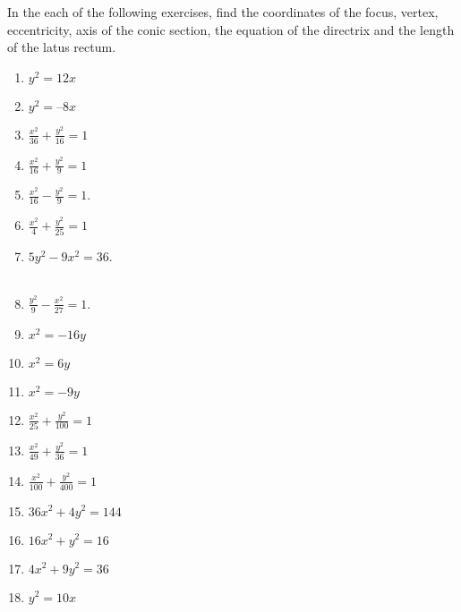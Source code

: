 In the each of the following exercises, find the coordinates of the focus, vertex, eccentricity, axis of the conic section, the equation of the directrix and the length of the latus rectum.
\begin{enumerate}[label=\thesubsection.\arabic*,ref=\thesubsection.\theenumi]
\item $y^2=12x$ 
\label{chapters/11/11/2/1}
\\
\solution

\item 
$y^2 = –8x$
  \item $\frac{x^2}{36}+\frac{y^2}{16}=1$
\\
\solution

  \item $\frac{x^2}{16}+\frac{y^2}{9}=1$
	\item $\frac{x^2}{16}-\frac{y^2}{9} = 1$. \\ 
		\solution
		
\begin{table}[H]
\centering
\caption{}
\label{tab:std-conic-params-sol}
\resizebox{\columnwidth}{!}{%
		
		}
\end{table}
  \item $\frac{x^2}{4}+\frac{y^2}{25}=1$
\\
\solution

	\item $5{y^2}-9{x^2}=36$.
		\\
		\solution
		\\
		
	\item $\frac{y^2}{9}-\frac{x^2}{27}=1$.
\item $x^2=-16y$
\\
\solution

\item $x^2=6y$ 
\\
\solution

\begin{table}[H]
\centering
\caption{}
\label{tab:rot-conic-params-sol}
\resizebox{\columnwidth}{!}{%
		
		}
\end{table}
\item $x^2=-9y$  
  \item $\frac{x^2}{25}+\frac{y^2}{100}=1$
  \item $\frac{x^2}{49}+\frac{y^2}{36}=1$
  \item $\frac{x^2}{100}+\frac{y^2}{400}=1$
  \item $36x^2+4y^2=144$
  \item $16x^2+y^2=16$
  \item $4x^2+9y^2=36$
\item $y^2=10x$  
\end{enumerate}

